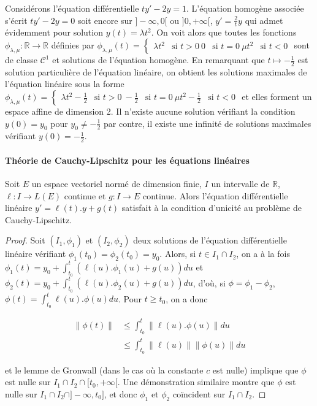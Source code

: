 \begin{example}
Considérons l'équation différentielle $ty' - 2y = 1$.
L'équation homogène associée s'écrit $ty' - 2y = 0$ soit encore sur $]-\infty,0[$ ou $]0,+\infty[$, $y' = \frac{2}{t} y$ qui admet
évidemment pour solution $y(t) = \lambda t^2$. On voit alors que
toutes les fonctions $\phi_{\lambda,\mu} : \mathbb{R} \rightarrow \mathbb{R}$ définies par
$\phi_{\lambda,\mu}(t) = \begin{cases}
\lambda t^2 & \text{si } t > 0 \
0 & \text{si } t = 0 \
\mu t^2 & \text{si } t < 0
\end{cases}$ sont de classe $\mathcal{C}^1$
et solutions de l'équation homogène. En remarquant que
$t \mapsto -\frac{1}{2}$ est
solution particulière de l'équation linéaire, on obtient les solutions
maximales de l'équation linéaire sous la forme
$\phi_{\lambda,\mu}(t) = \begin{cases}
\lambda t^2 - \frac{1}{2} & \text{si } t > 0 \
-\frac{1}{2} & \text{si } t = 0 \
\mu t^2 - \frac{1}{2} & \text{si } t < 0
\end{cases}$
et elles forment un espace affine de dimension 2.
Il n'existe aucune solution vérifiant la condition $y(0) = y_0$
pour $y_0 \neq -\frac{1}{2}$ par contre, il existe une infinité de solutions maximales vérifiant
$y(0) = -\frac{1}{2}$.
\end{example}
\paragraph{Théorie de Cauchy-Lipschitz pour les équations linéaires}
\begin{lem}
Soit $E$ un espace vectoriel normé de dimension finie, $I$ un
intervalle de $\mathbb{R}$, $\ell : I \rightarrow L(E)$ continue et $g : I \rightarrow E$ continue. Alors
l'équation différentielle linéaire $y' = \ell(t).y + g(t)$ satisfait à la
condition d'unicité au problème de Cauchy-Lipschitz.
\end{lem}
\begin{proof}
Soit $(I_1,\phi_1)$ et
$(I_2,\phi_2)$ deux solutions de l'équation différentielle
linéaire vérifiant $\phi_1(t_0) = \phi_2(t_0) = y_0$. Alors, si $t \in I_1 \cap I_2$, on a à la fois $\phi_1(t) = y_0 + \int_{t_0}^t (\ell(u).\phi_1(u) + g(u)) du$ et
$\phi_2(t) = y_0 + \int_{t_0}^t (\ell(u).\phi_2(u) + g(u)) du$, d'où, si
$\phi = \phi_1 - \phi_2$, $\phi(t) = \int_{t_0}^t \ell(u).\phi(u) du$. Pour $t \geq t_0$, on a
donc

\begin{align*}
\|\phi(t)\| &\leq \int_{t_0}^t \|\ell(u).\phi(u)\| du \\
&\leq \int_{t_0}^t \|\ell(u)\| \|\phi(u)\| du
\end{align*}

et le lemme de Gronwall (dans le cas où la constante $c$ est nulle)
implique que $\phi$ est nulle sur $I_1 \cap I_2 \cap [t_0,+\infty[$. Une démonstration similaire montre que $\phi$ est
nulle sur $I_1 \cap I_2 \cap ]-\infty,t_0]$, et donc
$\phi_1$ et $\phi_2$ coïncident sur $I_1 \cap I_2$.
\end{proof}

